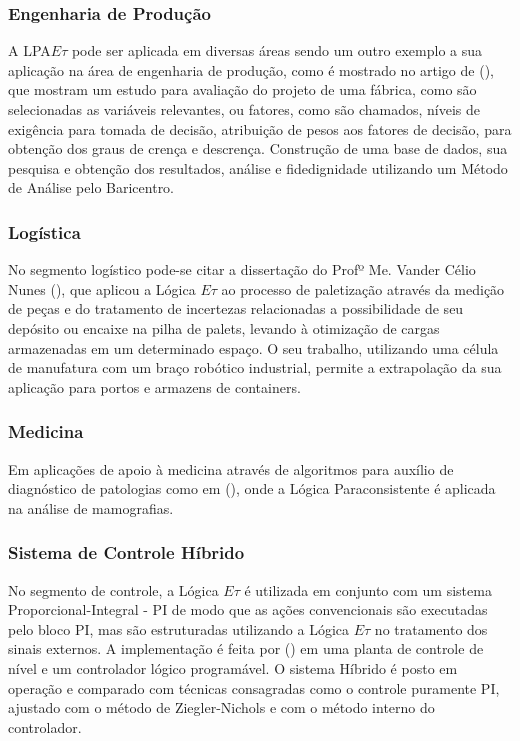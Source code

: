 \subsubsection{Engenharia de Produção}

A LPA$E\tau$ pode ser aplicada em diversas áreas sendo um outro exemplo a sua aplicação na área de engenharia de produção, como é mostrado no artigo de \citeauthor{FabioIsraelJair}(\citeyear{FabioIsraelJair}), que mostram um estudo para avaliação do projeto de uma fábrica, como são selecionadas as variáveis relevantes, ou fatores, como são chamados, níveis de exigência para tomada de decisão, 
atribuição de pesos aos fatores de decisão, para obtenção dos graus de crença e descrença. 
Construção de uma base de dados, sua pesquisa e obtenção dos resultados, análise e fidedignidade utilizando um Método de Análise pelo Baricentro.


\subsubsection{Logística}

No segmento logístico pode-se citar a dissertação do Profº Me. Vander Célio Nunes (\cite{Vander}), que aplicou a Lógica $E\tau$ ao processo de paletização através da medição de peças e do tratamento de incertezas relacionadas a possibilidade de seu depósito ou encaixe na pilha de palets, levando à otimização de cargas armazenadas em um determinado espaço. 
O seu trabalho, utilizando uma célula de manufatura com um braço robótico industrial, permite a extrapolação da sua aplicação para portos e armazens de containers.



\subsubsection{Medicina}

Em aplicações de apoio à medicina através de algoritmos para auxílio de diagnóstico de patologias como em \citeauthor{MauricioCM}(\citeyear{MauricioCM}), onde a Lógica Paraconsistente é aplicada na análise de mamografias.



\subsubsection{Sistema de Controle Híbrido}

No segmento de controle, a Lógica $E\tau$ é utilizada em conjunto com um sistema Proporcional-Integral - PI de modo que as ações convencionais são executadas pelo bloco PI, mas são estruturadas utilizando a Lógica $E\tau$ no tratamento dos sinais externos. 
A implementação é feita por \citeauthor{Marcelo}(\citeyear{Marcelo}) em uma planta de controle de nível e um controlador lógico programável. 
O sistema Híbrido é posto em operação e comparado com técnicas consagradas como o controle puramente PI, ajustado com o método de Ziegler-Nichols e com o método interno do controlador. 




